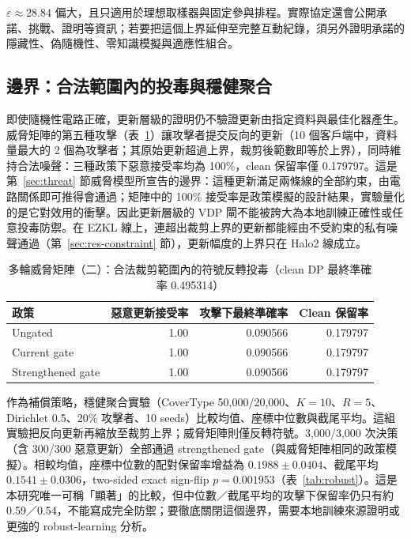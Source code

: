 \documentclass[12pt,a4paper]{article}
\newcommand{\eps}{\varepsilon}
\begin{document}
$\eps\approx28.84$ 偏大，且只適用於理想取樣器與固定參與排程。實際協定還會公開承諾、挑戰、證明等資訊；若要把這個上界延伸至完整互動紀錄，須另外證明承諾的隱藏性、偽隨機性、零知識模擬與適應性組合。

\subsection{邊界：合法範圍內的投毒與穩健聚合}
\label{sec:threatmatrix}
即使隨機性電路正確，更新層級的證明仍不驗證更新由指定資料與最佳化器產生。威脅矩陣的第五種攻擊（表~\ref{tab:threat-boundary}）讓攻擊者提交反向的更新（10 個客戶端中，資料量最大的 2 個為攻擊者；其原始更新超過上界，裁剪後範數即等於上界），同時維持合法噪聲：三種政策下惡意接受率均為 100\%，clean 保留率僅 0.179797。這是第~\ref{sec:threat} 節威脅模型所宣告的邊界：這種更新滿足兩條線的全部約束，由電路關係即可推得會通過；矩陣中的 100\% 接受率是政策模擬的設計結果，實驗量化的是它對效用的衝擊。因此更新層級的 VDP 閘不能被誇大為本地訓練正確性或任意投毒防禦。在 EZKL 線上，連超出裁剪上界的更新都能經由不受約束的私有噪聲通過（第~\ref{sec:res-constraint} 節），更新幅度的上界只在 Halo2 線成立。

\begin{table}[H]
\centering\small
\caption{多輪威脅矩陣（二）：合法裁剪範圍內的符號反轉投毒（clean DP 最終準確率 0.495314）}
\label{tab:threat-boundary}
\begin{tabular}{lrrr}
\toprule
政策 & 惡意更新接受率 & 攻擊下最終準確率 & Clean 保留率 \\
\midrule
Ungated & 1.00 & 0.090566 & 0.179797 \\
Current gate & 1.00 & 0.090566 & 0.179797 \\
Strengthened gate & 1.00 & 0.090566 & 0.179797 \\
\bottomrule
\end{tabular}
\end{table}

作為補償策略，穩健聚合實驗（CoverType 50,000/20,000、$K=10$、$R=5$、Dirichlet 0.5、20\% 攻擊者、10 seeds）比較均值、座標中位數與截尾平均。這組實驗把反向更新再縮放至裁剪上界；威脅矩陣則僅反轉符號。3,000/3,000 次決策（含 300/300 惡意更新）全部通過 strengthened gate（與威脅矩陣相同的政策模擬）。相較均值，座標中位數的配對保留率增益為 $0.1988\pm0.0404$、截尾平均 $0.1541\pm0.0306$，two-sided exact sign-flip $p=0.001953$（表~\ref{tab:robust}）。這是本研究唯一可稱「顯著」的比較，但中位數／截尾平均的攻擊下保留率仍只有約 0.59／0.54，不能寫成完全防禦；要徹底關閉這個邊界，需要本地訓練來源證明或更強的 robust-learning 分析。
\end{document}
